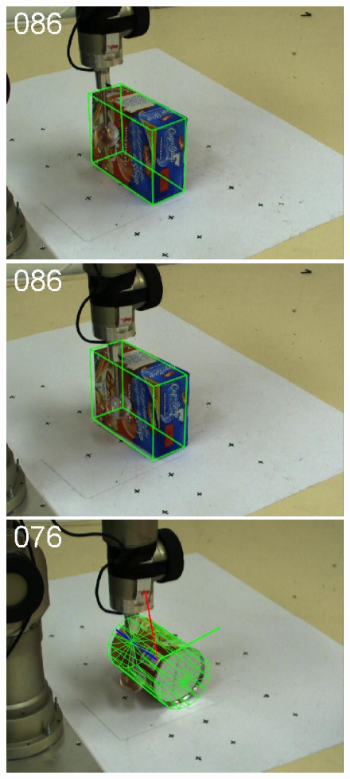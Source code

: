 \begin{figure}[htbp]
{\includegraphics[width=\imgAXwid]{./A2_LWPR1_399_1}
\includegraphics[width=\imgAXwid]{./A2_2exp_87_1}
\includegraphics[width=\imgAXwid]{./A3_2exp_39_1}
}
\end{figure}
